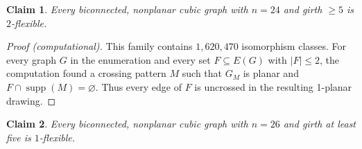 \documentclass[a4paper,11pt]{article}
\theoremstyle{plain}
\newtheorem{claim}{Claim}
\theoremstyle{definition}  %
\begin{document}
\begin{claim}\label{clm:flexible24}
    Every biconnected, nonplanar cubic graph with $n=24$ and girth $\geq 5$
    is $2$-flexible.
\end{claim}

\begin{proof}[Proof (computational)]
    This family contains $1{,}620{,}470$ isomorphism classes.  For every graph
    $G$ in the enumeration and every set $F\subseteq E(G)$ with $|F|\leq 2$,
    the computation found a crossing pattern $M$ such that $G_M$ is planar and
    $F\cap\operatorname{supp}(M)=\varnothing$.  Thus every edge of $F$ is
    uncrossed in the resulting 1-planar drawing.
\end{proof}

\begin{claim}\label{clm:flexible26}
    Every biconnected, nonplanar cubic graph with $n=26$ and girth
    at least five is $1$-flexible.
\end{claim}
\end{document}
